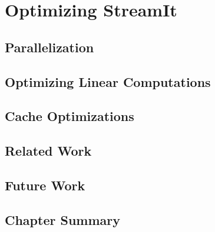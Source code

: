 \chapter{Optimizing StreamIt}
\label{chap:optimizing}

\section{Parallelization}

\section{Optimizing Linear Computations}

\section{Cache Optimizations}

\section{Related Work}

\section{Future Work}

\section{Chapter Summary}





